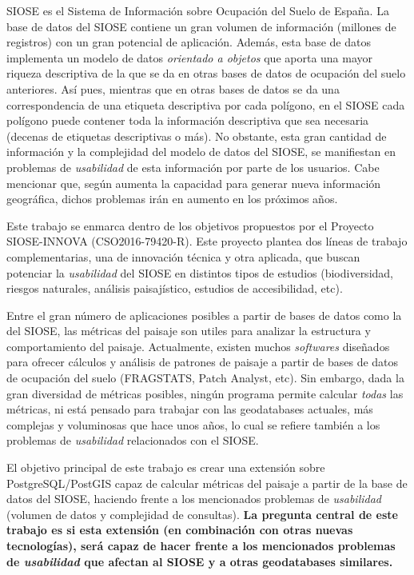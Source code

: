 
\begin{resumen}

SIOSE es el Sistema de Información sobre Ocupación del Suelo de España. La base de datos del SIOSE contiene un gran volumen de información (millones de registros) con un gran potencial de aplicación. Además, esta base de datos implementa un modelo de datos \textit{orientado a objetos} que aporta una mayor riqueza descriptiva de la que se da en otras bases de datos de ocupación del suelo anteriores. Así pues, mientras que en otras bases de datos se da una correspondencia de una etiqueta descriptiva por cada polígono, en el SIOSE cada polígono puede contener toda la información descriptiva que sea necesaria (decenas de etiquetas descriptivas o más). No obstante, esta gran cantidad de información y la complejidad del modelo de datos del SIOSE, se manifiestan en problemas de \textit{usabilidad} de esta información por parte de los usuarios. Cabe mencionar que, según aumenta la capacidad para generar nueva información geográfica, dichos problemas irán en aumento en los próximos años.

Este trabajo se enmarca dentro de los objetivos propuestos por el Proyecto SIOSE-INNOVA (CSO2016-79420-R). Este proyecto plantea dos líneas de trabajo complementarias, una de innovación técnica y otra aplicada, que buscan potenciar la \textit{usabilidad} del SIOSE en distintos tipos de estudios (biodiversidad, riesgos naturales, análisis paisajístico, estudios de accesibilidad, etc).

Entre el gran número de aplicaciones posibles a partir de bases de datos como la del SIOSE, las métricas del paisaje son utiles para analizar la estructura y comportamiento del paisaje. Actualmente, existen muchos \textit{softwares} diseñados para ofrecer cálculos y análisis de patrones de paisaje a partir de bases de datos de ocupación del suelo (FRAGSTATS, Patch Analyst, etc). Sin embargo, dada la gran diversidad de métricas posibles, ningún programa permite calcular \textit{todas} las métricas, ni está pensado para trabajar con las geodatabases actuales, más complejas y voluminosas que hace unos años, lo cual se refiere también a los problemas de \textit{usabilidad} relacionados con el SIOSE.

El objetivo principal de este trabajo es crear una extensión sobre PostgreSQL/PostGIS capaz de calcular métricas del paisaje a partir de la base de datos del SIOSE, haciendo frente a los mencionados problemas de \textit{usabilidad} (volumen de datos y complejidad de consultas). \textbf{La pregunta central de este trabajo es si esta extensión (en combinación con otras nuevas tecnologías), será capaz de hacer frente a los mencionados problemas de \textit{usabilidad} que afectan al SIOSE y a otras geodatabases similares.}


\end{resumen}
